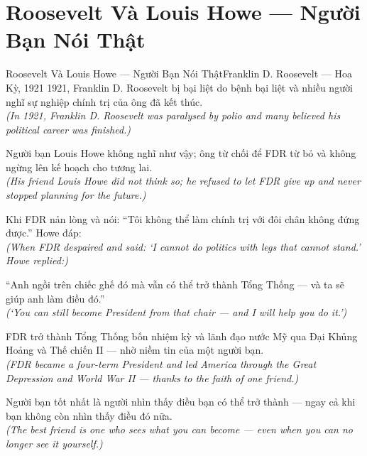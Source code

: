 \section{Roosevelt Và Louis Howe --- Người Bạn Nói Thật}
\begin{truyen}{Roosevelt Và Louis Howe --- Người Bạn Nói Thật}{Franklin D. Roosevelt --- Hoa Kỳ, 1921}
 1921, Franklin D. Roosevelt bị bại liệt do bệnh bại liệt và nhiều người nghĩ sự nghiệp chính trị của ông đã kết thúc.\\[4pt]
\textit{(In 1921, Franklin D. Roosevelt was paralysed by polio and many believed his political career was finished.)}

Người bạn Louis Howe không nghĩ như vậy; ông từ chối để FDR từ bỏ và không ngừng lên kế hoạch cho tương lai.\\[4pt]
\textit{(His friend Louis Howe did not think so; he refused to let FDR give up and never stopped planning for the future.)}

Khi FDR nản lòng và nói: ``Tôi không thể làm chính trị với đôi chân không đứng được.'' Howe đáp:\\[4pt]
\textit{(When FDR despaired and said: `I cannot do politics with legs that cannot stand.' Howe replied:)}

``Anh ngồi trên chiếc ghế đó mà vẫn có thể trở thành Tổng Thống --- và ta sẽ giúp anh làm điều đó.''\\[4pt]
\textit{(`You can still become President from that chair --- and I will help you do it.')}

FDR trở thành Tổng Thống bốn nhiệm kỳ và lãnh đạo nước Mỹ qua Đại Khủng Hoảng và Thế chiến II --- nhờ niềm tin của một người bạn.\\[4pt]
\textit{(FDR became a four-term President and led America through the Great Depression and World War II --- thanks to the faith of one friend.)}

\end{truyen}
\begin{baihoc}
  Người bạn tốt nhất là người nhìn thấy điều bạn có thể trở thành --- ngay cả khi bạn không còn nhìn thấy điều đó nữa.\\[4pt]
  \textit{(The best friend is one who sees what you can become --- even when you can no longer see it yourself.)}
\end{baihoc}

